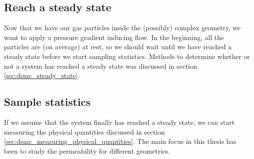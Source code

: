 \subsection{Reach a steady state}
Now that we have our gas particles inside the (possibly) complex geometry, we want to apply a pressure gradient inducing flow. In the beginning, all the particles are (on average) at rest, so we should wait until we have reached a steady state before we start sampling statistics. Methods to determine whether or not a system has reached a steady state was discussed in section \ref{sec:dsmc_steady_state}. 
\subsection{Sample statistics}
If we assume that the system finally has reached a steady state, we can start measuring the physical quantities discussed in section \ref{sec:dsmc_measuring_physical_quantities}. The main focus in this thesis has been to study the permeability for different geometries. 
